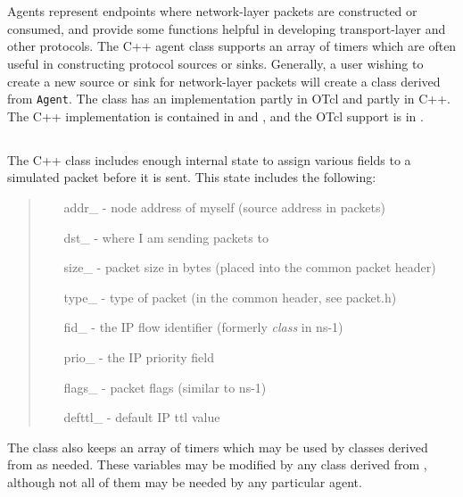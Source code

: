 %
%
\chapter{}

Agents represent endpoints where network-layer
packets are constructed or consumed, and provide
some functions helpful in developing transport-layer and other
protocols.
The C++ agent class supports an array of
timers which are often
useful in constructing protocol sources or sinks.
Generally, a user wishing to create a new
source or sink for network-layer packets
will create a class derived from {\tt Agent}.
The class  has an implementation partly in
OTcl and partly in C++.
The C++ implementation is contained in  and
, and the OTcl support is in
.

\section{}

The C++ class  includes enough internal state
to assign various fields to a simulated packet before
it is sent.
This state includes the following:
\begin{quote}
\begin{itemize}
        \item[addr\_] - node address of myself (source address in packets)
        \item[dst\_] - where I am sending packets to
        \item[size\_] - packet size in bytes (placed into the common packet header)
        \item[type\_] - type of packet (in the common header, see packet.h)
        \item[fid\_] - the IP flow identifier (formerly {\em class} in ns-1)
        \item[prio\_] - the IP priority field
	\item[flags\_] - packet flags (similar to ns-1)
	\item[defttl\_] - default IP ttl value
\end{itemize}
\end{quote}
The class also keeps an array of timers which may be used
by classes derived from  as needed.
These variables may be modified by any class derived from ,
although not all of them may be needed by any particular agent.


